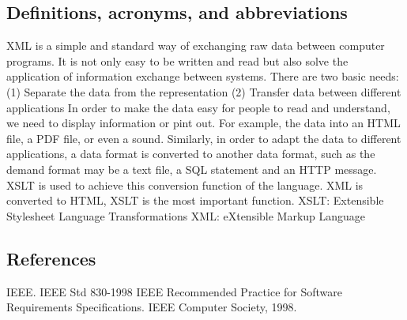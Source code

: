 \subsection{Definitions, acronyms, and abbreviations}
XML is a simple and standard way of exchanging raw data between computer programs.
It is not only easy to be written and read but also solve the application of information exchange between systems. 
There are two basic needs:
(1) Separate the data from the representation
(2) Transfer data between different applications
In order to make the data easy for people to read and understand, we need to display information or pint out. For example, the data into an HTML file, a PDF file, or even a sound. Similarly, in order to adapt the data to different applications, a data format is converted to another data format, such as the demand format may be a text file, a SQL statement and an HTTP message. XSLT is used to achieve this conversion function of the language. XML is converted to HTML, XSLT is the most important function. 
XSLT: Extensible Stylesheet Language Transformations
XML: eXtensible Markup Language



\subsection{References}
IEEE. IEEE Std 830-1998 IEEE Recommended Practice for Software Requirements Specifications. IEEE Computer Society, 1998.


\cite{xalan}
\cite{xerces}
\cite{icu}




